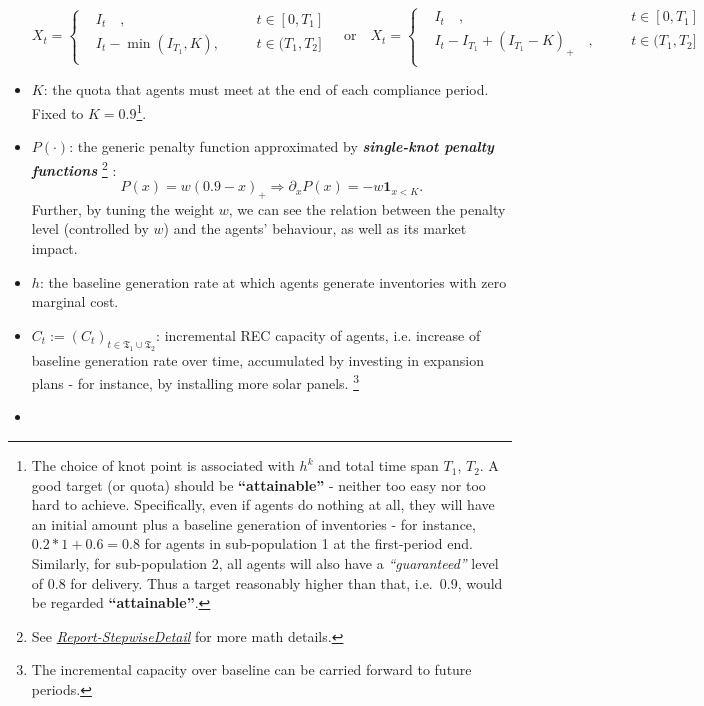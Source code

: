 \documentclass[a4paper,10pt]{article}
\newcommand{\1}{\mathbf{1}}
\begin{document}
\begin{itemize}
  \[
    X_t=
    \begin{cases}
        & I_t\quad,                  \quad&& t \in [0,T_1]\\
        & I_t- \min(I_{T_1},K), \quad&& t \in (T_1,T_2]\\
    \end{cases} 
    \quad\text{or}\quad
    X_t=
    \begin{cases}
        & I_t\quad,                                           \quad&& t \in [0,T_1]\\
        & I_t-I_{T_1}+(I_{T_1}-K)_+\quad, \quad&& t \in (T_1,T_2]\\
    \end{cases} 
    \]
\item
  \(K\): the quota that agents must meet at the end of each compliance
  period. Fixed to \(K=0.9\)\footnote{The choice of knot point is
    associated with \(h^{k}\) and total time span \(T_1\), \(T_2\). A
    good target (or quota) should be \textbf{``attainable''} - neither
    too easy nor too hard to achieve. Specifically, even if agents do
    nothing at all, they will have an initial amount plus a baseline
    generation of inventories - for instance, \(0.2*1 + 0.6=0.8\) for
    agents in sub-population 1 at the first-period end. Similarly, for
    sub-population 2, all agents will also have a \emph{``guaranteed''}
    level of 0.8 for delivery. Thus a target reasonably higher than
    that, i.e.~0.9, would be regarded \textbf{``attainable''}.}.
\item
  \(P(\cdot)\): the generic penalty function approximated by
  \emph{\textbf{single-knot penalty functions}} \footnote{See
    \href{../FinalReports/Report-StepwiseDetail.md}{\emph{Report-StepwiseDetail}}
    for more math details.} :
  \[P(x)=w(0.9-x)_+ \Rightarrow\partial_{x}P(x) = - w\mathbf{1}_{x<K}.\]
  Further, by tuning the weight \(w\), we can see the relation between
  the penalty level (controlled by \(w\)) and the agents' behaviour, as
  well as its market impact.
\item
  \(h\): the baseline generation rate at which agents generate inventories with zero
  marginal cost.
\item
  \(C_t := (C_t)_{t\in\mathfrak{T_1} \cup \mathfrak{T_2}}\): incremental
  REC capacity of agents, i.e. increase of baseline generation rate
  over time, accumulated by investing in expansion plans - for instance,
  by installing more solar panels. \footnote{The incremental capacity
    over baseline can be carried forward to future periods.}
\item

\end{itemize}
\end{document}
